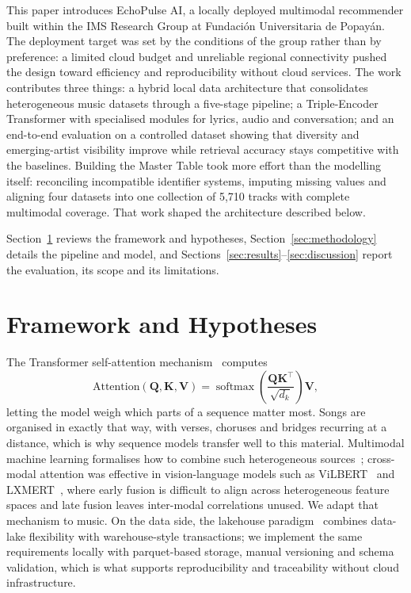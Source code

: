 \documentclass[]{ceurart}
\newcommand{\mat}[1]{\mathbf{#1}}
\newcommand{\softmax}{\operatorname{softmax}}
\begin{document}
This paper introduces EchoPulse AI, a locally deployed multimodal recommender
built within the IMS Research Group at Fundación Universitaria de Popayán. The
deployment target was set by the conditions of the group rather than by
preference: a limited cloud budget and unreliable regional connectivity pushed
the design toward efficiency and reproducibility without cloud services. The
work contributes three things: a hybrid local data architecture that
consolidates heterogeneous music datasets through a five-stage pipeline; a
Triple-Encoder Transformer with specialised modules for lyrics, audio and
conversation; and an end-to-end evaluation on a controlled dataset showing that
diversity and emerging-artist visibility improve while retrieval accuracy stays
competitive with the baselines. Building the Master Table took more effort than
the modelling itself: reconciling incompatible identifier systems, imputing
missing values and aligning four datasets into one collection of 5,710 tracks
with complete multimodal coverage. That work shaped the architecture described
below.

Section~\ref{sec:framework} reviews the framework and hypotheses,
Section~\ref{sec:methodology} details the pipeline and model, and
Sections~\ref{sec:results}--\ref{sec:discussion} report the evaluation, its
scope and its limitations.

\section{Framework and Hypotheses}
\label{sec:framework}

The Transformer self-attention mechanism~\cite{vaswani2017attention} computes
\begin{equation}
\text{Attention}(\mat{Q},\mat{K},\mat{V})
  = \softmax\left(\frac{\mat{Q}\mat{K}^\top}{\sqrt{d_k}}\right)\mat{V},
\label{eq:attention}
\end{equation}
letting the model weigh which parts of a sequence matter most. Songs are
organised in exactly that way, with verses, choruses and bridges recurring at a
distance, which is why sequence models transfer well to this material.
Multimodal machine learning formalises how to combine such heterogeneous
sources~\cite{baltruvsaitis2019multimodal}; cross-modal attention was effective
in vision-language models such as ViLBERT~\cite{lu2019vilbert} and
LXMERT~\cite{tan2019lxmert}, where early fusion is difficult to align across
heterogeneous feature spaces and late fusion leaves inter-modal correlations
unused. We adapt that mechanism to music. On the data side, the lakehouse
paradigm~\cite{armbrust2020delta} combines data-lake flexibility with
warehouse-style transactions; we implement the same requirements locally with
parquet-based storage, manual versioning and schema validation, which is what
supports reproducibility and traceability without cloud infrastructure.
\end{document}
